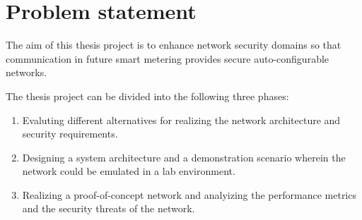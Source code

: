 \section{Problem statement}
The aim of this thesis project is to  enhance network security domains so that communication in future smart metering provides secure auto-configurable networks.

The thesis project can be divided into the following three phases:
\begin{enumerate}
\item Evaluting different alternatives for realizing the network architecture and security requirements.
\item Designing a system architecture and a demonstration scenario wherein the network could be emulated in a lab environment.
\item Realizing a proof-of-concept network and analyizing the performance metrics and the security threats of the network.
\end{enumerate}